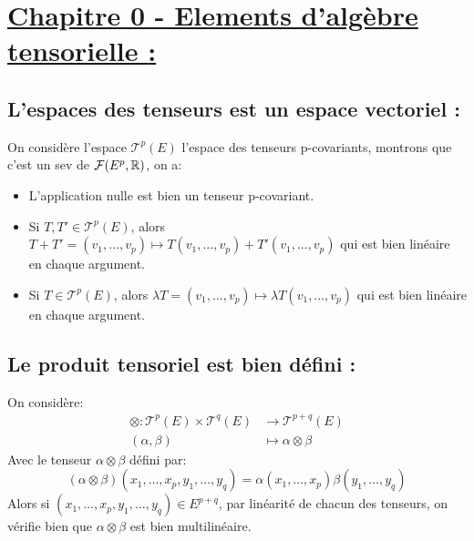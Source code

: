 \section*{\uline{Chapitre 0 - Elements d'algèbre tensorielle {:}}}
   \subsection*{L'espaces des tenseurs est un espace vectoriel {:}}
On considère l'espace \( \mathscr{T}^p(E) \) l'espace des tenseurs p-covariants, montrons que c'est un sev de \( \mathcal{F}(E^p, \mathbb{R}) \), on a:
\begin{itemize}
   \item L'application nulle est bien un tenseur p-covariant.
   \item Si \( T, T' \in \mathscr{T}^p(E)\), alors \( T + T' = (v_1, \ldots, v_p) \mapsto T(v_1, \ldots, v_p) + T'(v_1, \ldots, v_p) \) qui est bien linéaire en chaque argument.
   \item Si \( T \in \mathscr{T}^p(E)\), alors \( \lambda T = (v_1, \ldots, v_p) \mapsto \lambda T(v_1, \ldots, v_p) \) qui est bien linéaire en chaque argument.
\end{itemize}
   \subsection*{Le produit tensoriel est bien défini {:}}
On considère: 
\begin{align*}
   \otimes : \mathscr{T}^p(E) \times \mathscr{T}^q(E) &\longrightarrow \mathscr{T}^{p+q}(E)\\
   (\alpha, \beta) &\longmapsto \alpha \otimes \beta
\end{align*}
Avec le tenseur \(\alpha \otimes \beta\) défini par:
\[
   (\alpha \otimes \beta)(x_1, \ldots, x_p, y_1, \ldots, y_q) = \alpha(x_1, \ldots, x_p)\beta(y_1, \ldots, y_q)
\]
Alors si \( (x_1, \ldots, x_p, y_1, \ldots, y_q) \in E^{p+q} \), par linéarité de chacun des tenseurs, on vérifie bien que \( \alpha \otimes \beta \) est bien multilinéaire.
